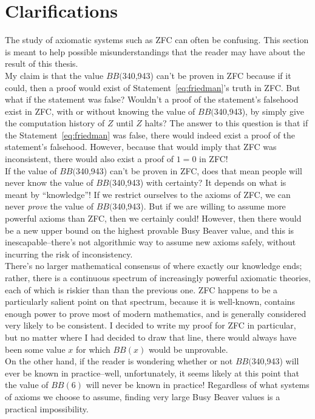 \documentclass[11pt]{report}
\newcommand{\bbstatenum}{$BB($340,943) }
\newcommand{\bbstatenumcomma}{$BB($340,943), }
\newcommand{\bbstatenumperiod}{$BB($340,943). }
\begin{document}
\section{Clarifications \label{sec:faq}}

The study of axiomatic systems such as ZFC can often be confusing. This section is meant to help possible misunderstandings that the reader may have about the result of this thesis. \\

My claim is that the value \bbstatenum can't be proven in ZFC because if it could, then a proof would exist of Statement~\ref{eq:friedman}'s truth in ZFC. But what if the statement was false? Wouldn't a proof of the statement's falsehood exist in ZFC, with or without knowing the value of \bbstatenumcomma by simply give the computation history of $Z$ until $Z$ halts? The answer to this question is that if the Statement~\ref{eq:friedman} was false, there would indeed exist a proof of the statement's falsehood. However, because that would imply that ZFC was inconsistent, there would also exist a proof of $1=0$ in ZFC! \\

If the value of \bbstatenum can't be proven in ZFC, does that mean people will never know the value of \bbstatenum with certainty? It depends on what is meant by ``knowledge''! If we restrict ourselves to the axioms of ZFC, we can never \emph{prove} the value of \bbstatenumperiod But if we are willing to assume more powerful axioms than ZFC, then we certainly could! However, then there would be a new upper bound on the highest provable Busy Beaver value, and this is inescapable--there's not algorithmic way to assume new axioms safely, without incurring the risk of inconsistency.  \\

There's no larger mathematical consensus of where exactly our knowledge ends; rather, there is a continuous spectrum of increasingly powerful axiomatic theories, each of which is riskier than than the previous one. ZFC happens to be a particularly salient point on that spectrum, because it is well-known, contains enough power to prove most of modern mathematics, and is generally considered very likely to be consistent. I decided to write my proof for ZFC in particular, but no matter where I had decided to draw that line, there would always have been some value $x$ for which $BB(x)$ would be unprovable. \\

On the other hand, if the reader is wondering whether or not \bbstatenum will ever be known in practice--well, unfortunately, it seems likely at this point that the value of $BB(6)$ will never be known in practice! Regardless of what systems of axioms we choose to assume, finding very large Busy Beaver values is a practical impossibility.  %
\end{document}
